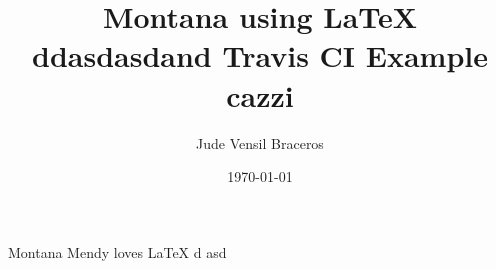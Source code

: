 \documentclass{article}
\title{Montana using LaTeX ddasdasdand Travis CI Example cazzi}
\author{Jude Vensil Braceros}
\date{\today}
\begin{document}
\maketitle

Montana Mendy loves LaTeX d asd
\end{document}
